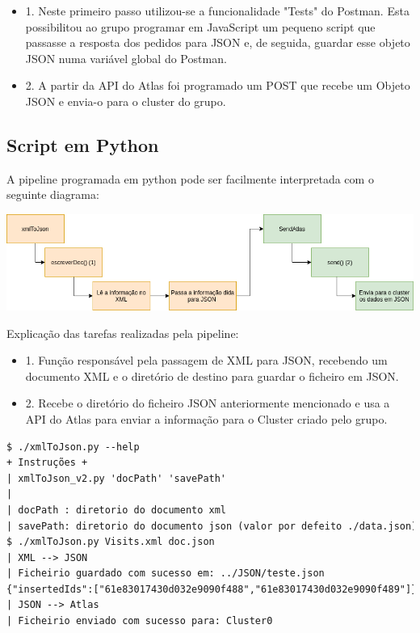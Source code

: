 \documentclass{article}
\begin{document}
\begin{itemize}
    \item 1. Neste primeiro passo utilizou-se a funcionalidade "Tests" do Postman. Esta possibilitou ao grupo programar em JavaScript um pequeno script que passasse a resposta dos pedidos para JSON e, de seguida, guardar esse objeto JSON numa variável global do Postman.
    \item 2. A partir da API do Atlas foi programado um POST que recebe um Objeto JSON e envia-o para o cluster do grupo.
\end{itemize}

\subsection{Script em Python}
\hspace{0.5cm} A pipeline programada em python pode ser facilmente interpretada com o seguinte diagrama:

\begin{center}
    \includegraphics[scale=0.515]{Images/pipelinePython.png}
\end{center}

\hspace{0.5cm}Explicação das tarefas realizadas pela pipeline:
\begin{itemize}
    \item 1. Função responsável pela passagem de XML para JSON, recebendo um documento XML e o diretório de destino para guardar o ficheiro em JSON.
    \item 2. Recebe o diretório do ficheiro JSON anteriormente mencionado e usa a API do Atlas para enviar a informação para o Cluster criado pelo grupo. 
\end{itemize}

\begin{lstlisting}[language=XML, caption=Output]
$ ./xmlToJson.py --help
+ Instruções + 
| xmlToJson_v2.py 'docPath' 'savePath' 
|
| docPath : diretorio do documento xml 
| savePath: diretorio do documento json (valor por defeito ./data.json) 
$ ./xmlToJson.py Visits.xml doc.json
| XML --> JSON         
| Ficheirio guardado com sucesso em: ../JSON/teste.json
{"insertedIds":["61e83017430d032e9090f488","61e83017430d032e9090f489"]}
| JSON --> Atlas         
| Ficheirio enviado com sucesso para: Cluster0 
\end{lstlisting}
\end{document}
